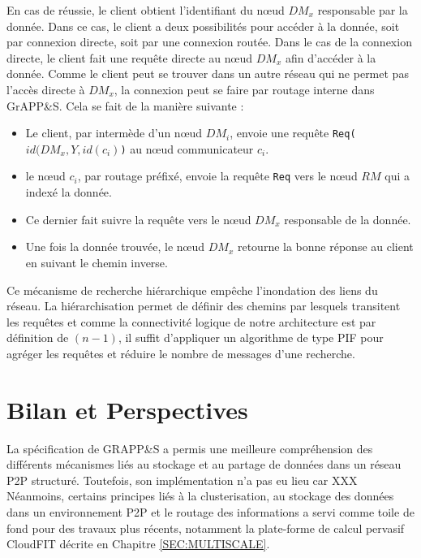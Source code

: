 En cas de réussie, le client obtient l'identifiant du n{\oe}ud $DM_x$ responsable par la donnée. Dans ce cas, le client a deux possibilités pour accéder à la donnée, soit par connexion directe, soit par une connexion routée. Dans le cas de la connexion directe, le client fait une requête directe au n{\oe}ud $DM_x$ afin d'accéder à la  donnée. Comme le client peut se trouver dans un autre réseau qui ne permet pas l'accès directe à $DM_x$, la connexion peut se faire par routage interne dans GrAPP\&S. Cela se fait de la manière suivante :
\begin{itemize}
	\item Le client, par intermède d'un n{\oe}ud $DM_i$, envoie une requête \texttt{Req($id(DM_x, Y, id(c_i)$)} au n{\oe}ud communicateur $c_i$.
	\item  le n{\oe}ud $c_i$, par routage préfixé, envoie la requête \texttt{Req} vers le n{\oe}ud $RM$ qui a indexé la donnée.
	\item  Ce dernier fait suivre la requête vers le n{\oe}ud $DM_x$ responsable de la donnée.
	\item Une fois la donnée trouvée, le n{\oe}ud $DM_x$ retourne la bonne réponse au client en suivant le chemin inverse.
\end{itemize}   

Ce mécanisme de recherche hiérarchique empêche l'inondation des liens du réseau. La hiérarchisation permet de définir des chemins par lesquels transitent les requêtes et comme la connectivité logique de notre architecture est par définition de $(n-1)$, il suffit d'appliquer un algorithme de type PIF pour agréger les requêtes et réduire le nombre de messages d'une recherche.  


\section{Bilan et Perspectives}

La spécification de GRAPP\&S a permis une meilleure compréhension des différents mécanismes liés au stockage et au partage de données dans un réseau P2P structuré. Toutefois, son implémentation n'a pas eu lieu car XXX
Néanmoins, certains principes liés à la clusterisation, au stockage des données dans un environnement P2P et le routage des informations a servi comme toile de fond pour des travaux plus récents, notamment la plate-forme de calcul pervasif CloudFIT décrite en  Chapitre \ref{SEC:MULTISCALE}.  
